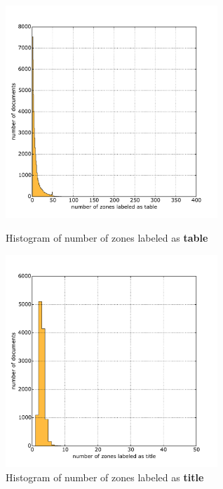   \begin{figure}
\centering
\begin{minipage}[t!]{0.48\linewidth}
  \includegraphics[width=8cm]{plots/table_histogram}
  \caption{Histogram of number of zones labeled as \textbf{table}}
  \label{fig:table_histogram}
\end{minipage}
\quad
\begin{minipage}[t!]{0.48\linewidth}
  \includegraphics[width=8cm]{plots/title_histogram}
  \caption{Histogram of number of zones labeled as \textbf{title}}
  \label{fig:title_histogram}
\end{minipage}
\end{figure}

